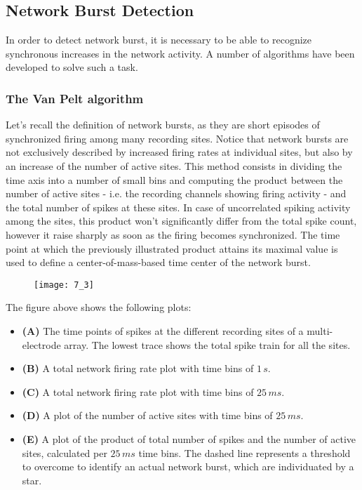 \subsection{Network Burst Detection}
In order to detect network burst, it is necessary to be able to recognize synchronous
increases in the network activity. A number of algorithms have been developed to
solve such a task.
\subsubsection{The Van Pelt algorithm}
Let's recall the definition of network bursts, as they are short episodes of
synchronized firing among many recording sites. Notice that network bursts are not
exclusively described by increased firing rates at individual sites, but also by an
increase of the number of active sites. This method consists in dividing the time
axis into a number of small bins and computing the product between the number of
active sites - i.e. the recording channels showing firing activity - and the total
number of spikes at these sites. In case of uncorrelated spiking activity among
the sites, this product won't significantly differ from the total spike count, however
it raise sharply as soon as the firing becomes synchronized. The time point at
which the previously illustrated product attains its maximal value is used to
define a center-of-mass-based time center of the network burst.
\begin{figure}[H]
    \texttt{[image: 7\_3]}
    \centering
\end{figure}
The figure above shows the following plots:
\begin{itemize}
    \item \textbf{(A)} The time points of spikes at the different recording sites of
    a multi-electrode array. The lowest trace shows the total spike train for all
    the sites.
    \item \textbf{(B)} A total network firing rate plot with time bins of \(1\,s\).
    \item \textbf{(C)} A total network firing rate plot with time bins of \(25\,ms\).
    \item \textbf{(D)} A plot of the number of active sites with time bins
    of \(25\,ms\).
    \item \textbf{(E)} A plot of the product of total number of spikes and the
    number of active sites, calculated per \(25\,ms\) time bins. The dashed line
    represents a threshold to overcome to identify an actual network burst, which
    are individuated by a star.
\end{itemize}
